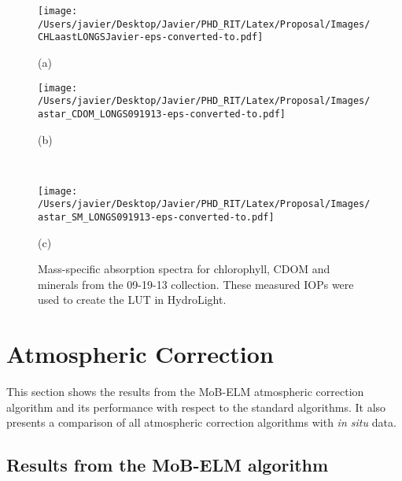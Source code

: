 \begin{figure}[htb]
    \begin{minipage}[c]{0.48\linewidth}
      \centering
    \texttt{[image: /Users/javier/Desktop/Javier/PHD\_RIT/Latex/Proposal/Images/CHLaastLONGSJavier-eps-converted-to.pdf]}
     \centerline{(a)}\medskip
    \end{minipage}
    \hfill
    \begin{minipage}[d]{0.48\linewidth}
      \centering
    \texttt{[image: /Users/javier/Desktop/Javier/PHD\_RIT/Latex/Proposal/Images/astar\_CDOM\_LONGS091913-eps-converted-to.pdf]}
     \centerline{(b)}\medskip
    \end{minipage}\\
    
    \begin{minipage}[d]{1.0\linewidth}
      \centering
    \texttt{[image: /Users/javier/Desktop/Javier/PHD\_RIT/Latex/Proposal/Images/astar\_SM\_LONGS091913-eps-converted-to.pdf]}
      \centerline{(c)}\medskip
    \end{minipage}
  \caption[Mass-specific absorption spectra for chlorophyll, CDOM and minerals from the 09-19-13 collection.]{Mass-specific absorption spectra for chlorophyll, CDOM and minerals from the 09-19-13 collection. These measured IOPs were used to create the LUT in HydroLight. \label{fig:IOPastLONGS} }  
\end{figure}

\section{Atmospheric Correction}
\label{sec:AC_Results}
This section shows the results from the MoB-ELM atmospheric correction algorithm and its performance with respect to the standard algorithms. It also presents a comparison of all atmospheric correction algorithms with {\it in situ} data.

\subsection{Results from the MoB-ELM algorithm}

